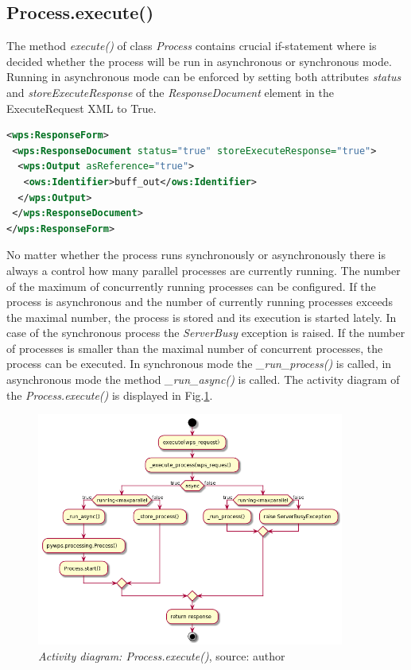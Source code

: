 \subsection{Process.execute()}
The method \textit{execute()} of class \textit{Process} contains crucial if-statement where is decided whether the process will be
run in asynchronous or synchronous mode. Running in asynchronous mode can be enforced by setting both attributes \textit{status} and \textit{storeExecuteResponse} of the \textit{ResponseDocument} element in the ExecuteRequest XML to True.

\bigskip
\begin{lstlisting}[basicstyle=\small,caption={ReponseForm element of ExecuteRequest XML},language=XML,label={lst:Execute_ResponseForm}]
<wps:ResponseForm>
 <wps:ResponseDocument status="true" storeExecuteResponse="true">
  <wps:Output asReference="true">
   <ows:Identifier>buff_out</ows:Identifier>
  </wps:Output>
 </wps:ResponseDocument>
</wps:ResponseForm>
\end{lstlisting}
\bigskip 

No matter whether the process runs synchronously or asynchronously there is always a control how many parallel processes are currently
running. The number of the maximum of concurrently running processes can be configured. If the process is asynchronous and the number of currently running processes exceeds the maximal number, the process is stored and its execution is started lately. In case of the synchronous process the \textit{ServerBusy} exception is raised. If the number of processes is smaller than the maximal number of 
concurrent processes, the process can be executed. In synchronous mode the \textit{\_run\_process()} is called, in asynchronous mode the method \textit{\_run\_async()} is called. The activity diagram of the \textit{Process.execute()} is displayed in Fig.\ref{fig:Diag_process_execute}.

\begin{figure}[h!]
\centering
\includegraphics[width=0.9\textwidth]{img/Diag_process_execute.png}
\caption{\textit{Activity diagram: Process.execute()}, source: author}
\label{fig:Diag_process_execute}
\end{figure}

